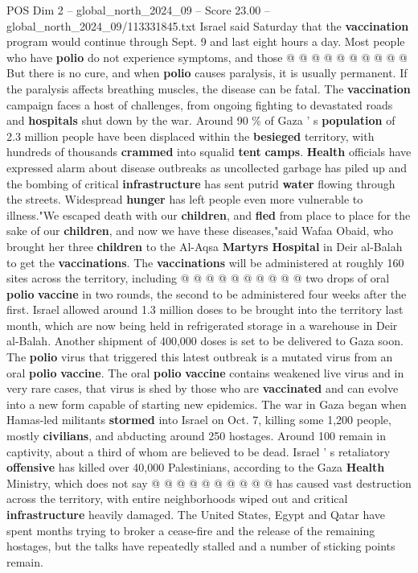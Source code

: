 \begin{textsample}{POS Dim 2 – global\_north\_2024\_09 – Score 23.00 – global\_north\_2024\_09/113331845.txt}
Israel said Saturday that the \textbf{vaccination} program would continue through Sept. 9 and last eight hours a day.
Most people who have \textbf{polio} do not experience symptoms, and those @ @ @ @ @ @ @ @ @ @ But there is no cure, and when \textbf{polio} causes paralysis, it is usually permanent.
If the paralysis affects breathing muscles, the disease can be fatal.
The \textbf{vaccination} campaign faces a host of challenges, from ongoing fighting to devastated roads and \textbf{hospitals} shut down by the war.
Around 90 \% of Gaza ' s \textbf{population} of 2.3 million people have been displaced within the \textbf{besieged} territory, with hundreds of thousands \textbf{crammed} into squalid \textbf{tent} \textbf{camps}. \textbf{Health} officials have expressed alarm about disease outbreaks as uncollected garbage has piled up and the bombing of critical \textbf{infrastructure} has sent putrid \textbf{water} flowing through the streets.
Widespread \textbf{hunger} has left people even more vulnerable to illness."We escaped death with our \textbf{children}, and \textbf{fled} from place to place for the sake of our \textbf{children}, and now we have these diseases,"said Wafaa Obaid, who brought her three \textbf{children} to the Al-Aqsa \textbf{Martyrs} \textbf{Hospital} in Deir al-Balah to get the \textbf{vaccinations}.
The \textbf{vaccinations} will be administered at roughly 160 sites across the territory, including @ @ @ @ @ @ @ @ @ @ two drops of oral \textbf{polio} \textbf{vaccine} in two rounds, the second to be administered four weeks after the first.
Israel allowed around 1.3 million doses to be brought into the territory last month, which are now being held in refrigerated storage in a warehouse in Deir al-Balah.
Another shipment of 400,000 doses is set to be delivered to Gaza soon.
The \textbf{polio} virus that triggered this latest outbreak is a mutated virus from an oral \textbf{polio} \textbf{vaccine}.
The oral \textbf{polio} \textbf{vaccine} contains weakened live virus and in very rare cases, that virus is shed by those who are \textbf{vaccinated} and can evolve into a new form capable of starting new epidemics.
The war in Gaza began when Hamas-led militants \textbf{stormed} into Israel on Oct. 7, killing some 1,200 people, mostly \textbf{civilians}, and abducting around 250 hostages.
Around 100 remain in captivity, about a third of whom are believed to be dead.
Israel ' s retaliatory \textbf{offensive} has killed over 40,000 Palestinians, according to the Gaza \textbf{Health} Ministry, which does not say @ @ @ @ @ @ @ @ @ @ has caused vast destruction across the territory, with entire neighborhoods wiped out and critical \textbf{infrastructure} heavily damaged.
The United States, Egypt and Qatar have spent months trying to broker a cease-fire and the release of the remaining hostages, but the talks have repeatedly stalled and a number of sticking points remain.

\end{textsample}
